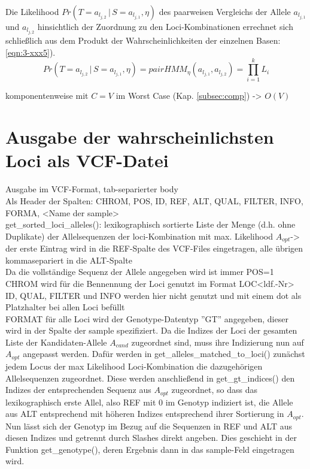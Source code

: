 Die Likelihood $ Pr(T=a_{l_{j,2}} \, | \, S=a_{l_{j,1}}, \eta) $ des paarweisen Vergleichs der Allele $a_{l_{j,1}}$ und $a_{l_{j,2}}$ hinsichtlich der Zuordnung zu den Loci-Kombinationen errechnet sich schließlich aus dem Produkt der Wahrscheinlichkeiten der einzelnen Basen:
\eqref{eqn:3-xxx5}).
\begin{equation} \label{eqn:3-xxx5}
\tag{3-xxx5}
Pr(T=a_{l_{j,2}} \, | \, S=a_{l_{j,1}}, \eta) = pairHMM_{\eta}(a_{l_{j,1}}, a_{l_{j,2}}) = \prod_{i=1}^{k}L_{i}
\end{equation}


komponentenweise mit $C = V$ im Worst Case (Kap. \ref{subsec:comp}) -> $O(V)$

\section{Ausgabe der wahrscheinlichsten Loci als VCF-Datei} \label{sec:vcf}

Ausgabe im VCF-Format, tab-separierter body\\
Als Header der Spalten: CHROM, POS, ID, REF, ALT, QUAL, FILTER, INFO, FORMA, <Name der sample>\\
get\_sorted\_loci\_alleles(): lexikographisch sortierte Liste der Menge (d.h. ohne Duplikate) der Allelsequenzen der loci-Kombination mit max. Likelihood $A_{opt}$-> der erste Eintrag wird in die REF-Spalte des VCF-Files eingetragen, alle übrigen kommasepariert in die ALT-Spalte\\

Da die vollständige Sequenz der Allele angegeben wird ist immer POS=1
CHROM wird für die Bennennung der Loci genutzt im Format LOC<ldf.-Nr>
ID, QUAL, FILTER und INFO werden hier nicht genutzt und mit einem dot als Platzhalter bei allen Loci befüllt\\
FORMAT für alle Loci wird der Genotype-Datentyp ''GT'' angegeben, dieser wird in der Spalte der sample spezifiziert. Da die Indizes der Loci der gesamten Liste der Kandidaten-Allele $A_{cand}$ zugeordnet sind, muss ihre Indizierung nun auf $A_{opt}$ angepasst werden.  Dafür werden in get\_alleles\_matched\_to\_loci() zunächst jedem Locus der max Likelihood Loci-Kombination die dazugehörigen Allelsequenzen zugeordnet. Diese werden anschließend in get\_gt\_indices() den Indizes der entsprechenden Sequenz aus $A_{opt}$ zugeordnet, so dass das lexikographisch erste Allel, also REF mit 0 im Genotyp indiziert ist, die Allele aus ALT entsprechend mit höheren Indizes entsprechend ihrer Sortierung in $A_{opt}$. Nun lässt sich der Genotyp im Bezug auf die Sequenzen in REF und ALT aus diesen Indizes und getrennt durch Slashes direkt angeben. Dies geschieht in der Funktion get\_genotype(), deren Ergebnis dann in das sample-Feld eingetragen wird.\\

